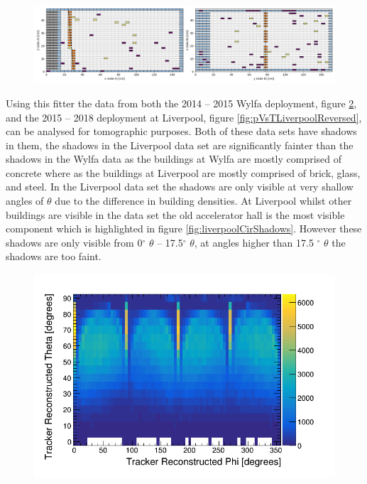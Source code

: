 \begin{figure}[H]
 \centering
 \includegraphics[width=\linewidth]{Chapter5/Figs/Raster/testEventNewScheme.png}
 \label{fig:3000ExampleEvent}
\end{figure}

Using this fitter the data from both the 2014 -- 2015 Wylfa deployment, figure \ref{fig:pVsTWylfaReversed}, and the 2015 -- 2018 deployment at Liverpool, figure \ref{fig:pVsTLiverpoolReversed}, can be analysed for tomographic purposes. Both of these data sets have shadows in them, the shadows in the Liverpool data set are significantly fainter than the shadows in the Wylfa data as the buildings at Wylfa are mostly comprised of concrete where as the buildings at Liverpool are mostly comprised of brick, glass, and steel. In the Liverpool data set the shadows are only visible at very shallow angles of $\theta$ due to the difference in building densities. At Liverpool whilst other buildings are visible in the data set the old accelerator hall is the most visible component which is highlighted in figure \ref{fig:liverpoolCirShadows}. However these shadows are only visible from 0$^{\circ}$ $\theta$ -- 17.5$^{\circ}$ $\theta$, at angles higher than 17.5 $^{\circ}$ $\theta$ the shadows are too faint. 
\begin{figure}[H]
 \centering
 \includegraphics[width=0.8\linewidth]{Chapter5/Figs/Raster/pVsTWylfaReversed.png}
 \label{fig:pVsTWylfaReversed}
\end{figure}

